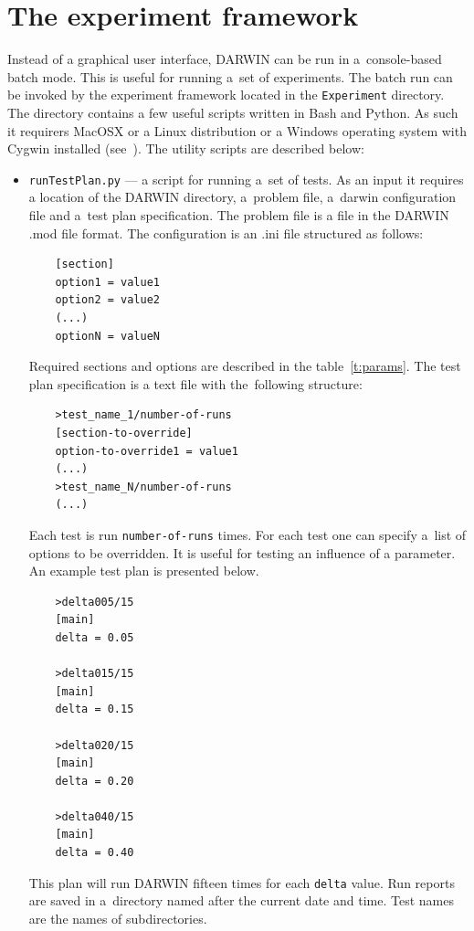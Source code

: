 \section*{The experiment framework} 

Instead of a graphical user interface, DARWIN can be run in a~console-based
batch mode. This is useful for running a~set of experiments. The batch run can
be invoked by the experiment framework located in the \texttt{Experiment}
directory. The directory contains a few useful scripts written in Bash and
Python. As such it requirers MacOSX or a Linux distribution or a Windows
operating system with Cygwin installed (see~\cite{Laz00}). The utility scripts
are described below:

\begin{itemize}
\item \texttt{runTestPlan.py} --- a script for running a~set of tests. As an
  input it requires a location of the DARWIN directory, a~problem file,
  a~darwin configuration file and a~test plan specification. The problem file
  is a file in the DARWIN .mod file format. The configuration is an .ini file
  structured as follows:
  \begin{lstlisting}
    [section]
    option1 = value1
    option2 = value2
    (...)
    optionN = valueN
  \end{lstlisting}

  
  Required sections and options are described in the table~\ref{t:params}. The
  test plan specification is a text file with the~following structure:
  \begin{lstlisting}
    >test_name_1/number-of-runs
    [section-to-override]
    option-to-override1 = value1
    (...)
    >test_name_N/number-of-runs
    (...)
  \end{lstlisting}

  Each test is run \texttt{number-of-runs} times. For each test one can
  specify a~list of options to be overridden. It is useful for testing an
  influence of a parameter. An example test plan is presented below.
  \begin{lstlisting}
    >delta005/15
    [main]
    delta = 0.05

    >delta015/15
    [main]
    delta = 0.15

    >delta020/15
    [main]
    delta = 0.20

    >delta040/15
    [main]
    delta = 0.40
  \end{lstlisting}

  This plan will run DARWIN fifteen times for each \texttt{delta} value. Run
  reports are saved in a~directory named after the current date and time. Test
  names are the names of subdirectories.


\end{itemize}
